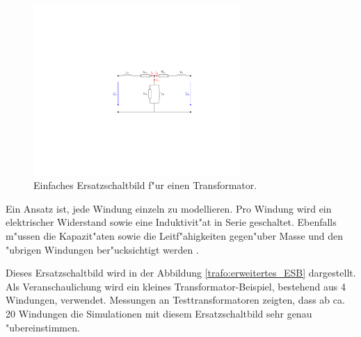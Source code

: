 \begin{refsection}
\begin{figure}
	\centering
	\includegraphics[width=0.7\textwidth]{./trafo/images/Einfaches_ESB.pdf}
	\caption[Einfaches Ersatzschaltbild f"ur einen Transformator]{Einfaches Ersatzschaltbild f"ur einen Transformator.}
	\label{trafo:einfaches_ESB}
\end{figure}

Ein Ansatz ist, jede Windung einzeln zu modellieren. Pro Windung wird ein elektrischer Widerstand sowie eine Induktivit"at in Serie geschaltet. Ebenfalls m"ussen die Kapazit"aten sowie die Leitf"ahigkeiten gegen"uber Masse und den "ubrigen Windungen ber"ucksichtigt werden \cite{trafo:BILImpulse}. 

Dieses Ersatzschaltbild wird in der Abbildung \ref{trafo:erweitertes_ESB} dargestellt. Als Veranschaulichung wird ein kleines Transformator-Beispiel, bestehend aus 4 Windungen, verwendet. Messungen an Testtransformatoren zeigten, dass ab ca. 20 Windungen die Simulationen mit diesem Ersatzschaltbild sehr genau "ubereinstimmen. 


\end{refsection}
